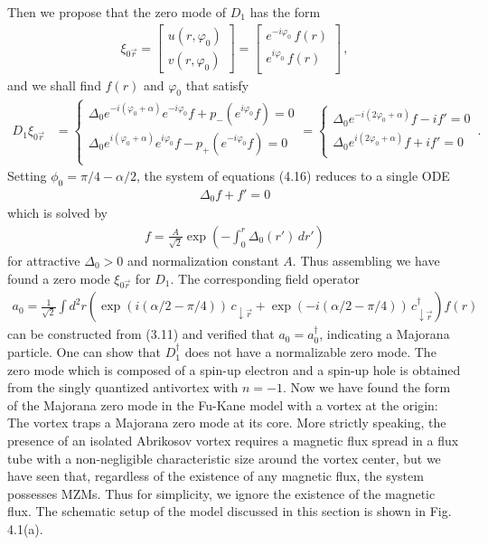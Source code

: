 \documentclass[11pt, oneside]{book}
\theoremstyle{break}
\theoremstyle{break}
\newcommand{\bmat}[1]{\begin{bmatrix} #1 \end{bmatrix}}
\begin{document}
Then we propose that the zero mode of $D_1$ has the form
\begin{align}
\xi_{0\vec{r}} = \bmat{u(r,\varphi_0)\\ v(r,\varphi_0)} = \bmat{
e^{-i\varphi_0}\,f(r)\\
e^{i\varphi_0}\,f(r)\\ 
}\,,
\end{align}
and we shall find $f(r)$ and $\varphi_0$ that satisfy
\begin{align}
D_1 \xi_{0\vec{r}} &=
\begin{cases} 
\Delta_0 e^{-i(\varphi_0+\alpha)}e^{-i\varphi_0}f + p_-\left(e^{i\varphi_0}f\right)=0\\
\Delta_0 e^{i(\varphi_0+\alpha)}e^{i\varphi_0}f -p_+\left(e^{-i\varphi_0}f\right)=0\\
\end{cases}
=
\begin{cases} 
\Delta_0 e^{-i(2\varphi_0+\alpha)}f -if'=0\\
\Delta_0 e^{i(2\varphi_0+\alpha)}f +i f'=0\\
\end{cases}\,.
\end{align}
Setting $\phi_0 = \pi/4 -\alpha/2$, the system of equations (4.16) reduces to a single ODE
\begin{align}
\Delta_0 f +f'=0
\end{align}
which is solved by 
\begin{align}
f = \frac{A}{\sqrt{2}}
\exp\left(
-\int_0^r \Delta_0(r')\, dr'\right)
\end{align}
for attractive $\Delta_0>0$ and normalization constant $A$. Thus assembling we have found a zero mode $\xi_{0\vec{r}}$ for $D_1$. The corresponding field operator
\begin{align}
a_0 = \frac{1}{\sqrt{2}}\int d^2r \left(
\exp\left(i(\alpha/2 - \pi/4)\right)\, c_{\downarrow\vec{r}} + \exp\left(-i (\alpha/2-\pi/4)\right)\, c_{\downarrow\vec{r}}^\dagger\right)  f(r)
\end{align}
can be constructed from (3.11) and verified that $a_0 = a_0^\dagger$, indicating a Majorana particle. One can show that $D_1^\dagger$ does not have a normalizable zero mode. 
The zero mode which is composed of a spin-up electron and a spin-up hole is obtained from the singly quantized antivortex with $n=-1$. Now we have found the form of the Majorana zero mode in the Fu-Kane model with a vortex at the origin: The vortex traps a Majorana zero mode at its core. More strictly speaking, the presence of an isolated Abrikosov vortex requires a magnetic flux spread in a flux tube with a non-negligible characteristic size around the vortex center, but we have seen that, regardless of the existence of any magnetic flux, the system possesses MZMs. Thus for simplicity, we ignore the existence of the magnetic flux. The schematic setup of the model discussed in this section is shown in Fig.\,4.1(a). 
\end{document}
